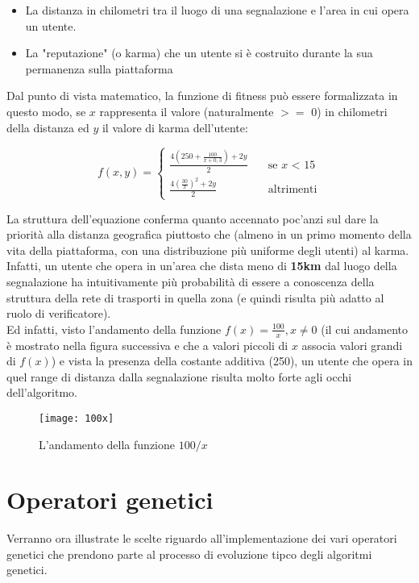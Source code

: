     \begin{itemize}
        \item La distanza in chilometri tra il luogo di una segnalazione e l'area in cui opera un utente.
        \item La "reputazione" (o karma) che un utente si è costruito durante la sua permanenza sulla piattaforma
    \end{itemize}

    Dal punto di vista matematico, la funzione di fitness può essere formalizzata in questo modo, se $x$ rappresenta il valore (naturalmente $>=$ 0) in chilometri della distanza ed $y$ il valore di karma dell'utente:

    \[ f(x, y) =
  \begin{cases}
    \frac{4(250 + \frac{100}{x+0,3}) + 2y}{2}      & \quad \text{se } x \text{ < 15}\\
    \frac{4(\frac{30}{x})^2 + 2y}{2}  & \quad \text{altrimenti}
  \end{cases}
\]

La struttura dell'equazione conferma quanto accennato poc'anzi sul dare la priorità alla distanza geografica piuttosto che (almeno in un primo momento della vita della piattaforma, con una distribuzione più uniforme degli utenti) al karma. Infatti, un utente che opera in un'area che dista meno di \textbf{15km} dal luogo della segnalazione ha intuitivamente più probabilità di essere a conoscenza della struttura della rete di trasporti in quella zona (e quindi risulta più adatto al ruolo di verificatore). \\
Ed infatti, visto l'andamento della funzione $f(x) = \frac{100}{x}, x \neq 0$ (il cui andamento è mostrato nella figura successiva e che a valori piccoli di $x$ associa valori grandi di $f(x)$) e vista la presenza della costante additiva (250), un utente che opera in quel range di distanza dalla segnalazione risulta molto forte agli occhi dell'algoritmo.
\begin{figure}[h!]
    \begin{center}
        \texttt{[image: 100x]}
    \end{center}
    \caption{L'andamento della funzione $100/x$}
    \label{fig: L'andamento della funzione $100/x$}
\end{figure}


\section{Operatori genetici}
  Verranno ora illustrate le scelte riguardo all'implementazione dei vari operatori genetici che prendono parte al processo di evoluzione tipco degli algoritmi genetici.

